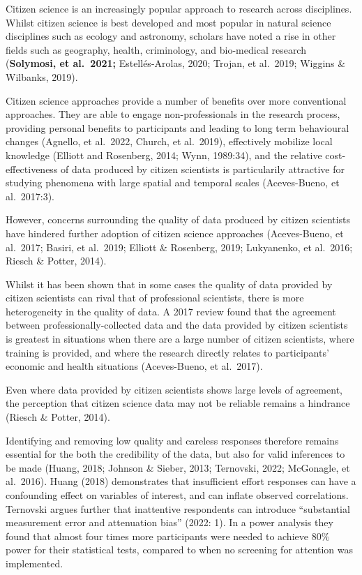 \documentclass[
]{article}
\begin{document}
Citizen science is an increasingly popular approach to research across
disciplines. Whilst citizen science is best developed and most popular
in natural science disciplines such as ecology and astronomy, scholars
have noted a rise in other fields such as geography, health,
criminology, and bio-medical research (\textbf{Solymosi, et al.~2021;}
Estellés-Arolas, 2020; Trojan, et al.~2019; Wiggins \& Wilbanks, 2019).

Citizen science approaches provide a number of benefits over more
conventional approaches. They are able to engage non-professionals in
the research process, providing personal benefits to participants and
leading to long term behavioural changes (Agnello, et al.~2022, Church,
et al.~2019), effectively mobilize local knowledge (Elliott and
Rosenberg, 2014; Wynn, 1989:34), and the relative cost-effectiveness of
data produced by citizen scientists is particularily attractive for
studying phenomena with large spatial and temporal scales (Aceves-Bueno,
et al.~2017:3).

However, concerns surrounding the quality of data produced by citizen
scientists have hindered further adoption of citizen science approaches
(Aceves-Bueno, et al.~2017; Basiri, et al.~2019; Elliott \& Rosenberg,
2019; Lukyanenko, et al.~2016; Riesch \& Potter, 2014).

Whilst it has been shown that in some cases the quality of data provided
by citizen scientists can rival that of professional scientists, there
is more heterogeneity in the quality of data. A 2017 review found that
the agreement between professionally-collected data and the data
provided by citizen scientists is greatest in situations when there are
a large number of citizen scientists, where training is provided, and
where the research directly relates to participants' economic and health
situations (Aceves-Bueno, et al.~2017).

Even where data provided by citizen scientists shows large levels of
agreement, the perception that citizen science data may not be reliable
remains a hindrance (Riesch \& Potter, 2014).

Identifying and removing low quality and careless responses therefore
remains essential for the both the credibility of the data, but also for
valid inferences to be made (Huang, 2018; Johnson \& Sieber, 2013;
Ternovski, 2022; McGonagle, et al.~2016). Huang (2018) demonstrates that
insufficient effort responses can have a confounding effect on variables
of interest, and can inflate observed correlations. Ternovski argues
further that inattentive respondents can introduce ``substantial
measurement error and attenuation bias'' (2022: 1). In a power analysis
they found that almost four times more participants were needed to
achieve 80\% power for their statistical tests, compared to when no
screening for attention was implemented.
\end{document}
